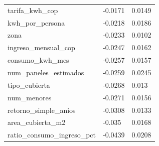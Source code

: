 {\begin{longtable}{@{}p{}ll@{}}
tarifa\_kwh\_cop & -0.0171 & 0.0149 \\
kwh\_por\_persona & -0.0218 & 0.0186 \\
zona & -0.0233 & 0.0102 \\
ingreso\_mensual\_cop & -0.0247 & 0.0162 \\
consumo\_kwh\_mes & -0.0257 & 0.0157 \\
num\_paneles\_estimados & -0.0259 & 0.0245 \\
tipo\_cubierta & -0.0268 & 0.013 \\
num\_menores & -0.0271 & 0.0156 \\
retorno\_simple\_anios & -0.0308 & 0.0133 \\
area\_cubierta\_m2 & -0.035 & 0.0168 \\
ratio\_consumo\_ingreso\_pct & -0.0439 & 0.0208 \\
\bottomrule
\end{longtable}}
